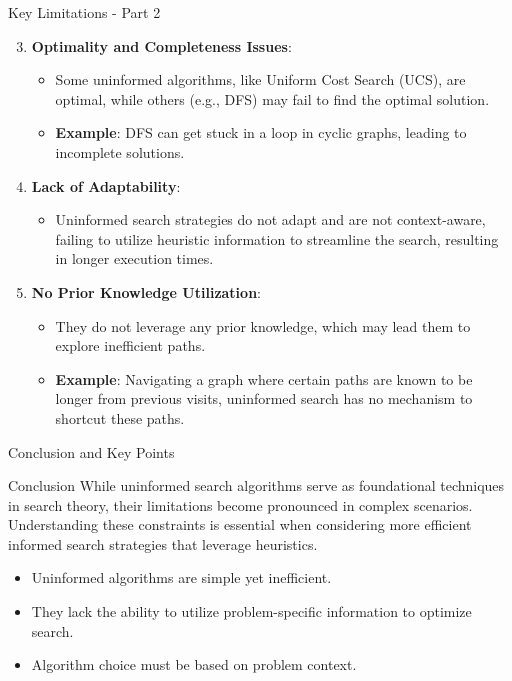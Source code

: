 \documentclass[aspectratio=169]{beamer}
\begin{document}
\begin{frame}[fragile]{Key Limitations - Part 2}
    \begin{enumerate}
        \setcounter{enumi}{2} %
        \item \textbf{Optimality and Completeness Issues}:
        \begin{itemize}
            \item Some uninformed algorithms, like Uniform Cost Search (UCS), are optimal, while others (e.g., DFS) may fail to find the optimal solution.
            \item \textbf{Example}: DFS can get stuck in a loop in cyclic graphs, leading to incomplete solutions.
        \end{itemize}
        
        \item \textbf{Lack of Adaptability}:
        \begin{itemize}
            \item Uninformed search strategies do not adapt and are not context-aware, failing to utilize heuristic information to streamline the search, resulting in longer execution times.
        \end{itemize}
        
        \item \textbf{No Prior Knowledge Utilization}:
        \begin{itemize}
            \item They do not leverage any prior knowledge, which may lead them to explore inefficient paths.
            \item \textbf{Example}: Navigating a graph where certain paths are known to be longer from previous visits, uninformed search has no mechanism to shortcut these paths.
        \end{itemize}
    \end{enumerate}
\end{frame}

\begin{frame}[fragile]{Conclusion and Key Points}
    \begin{block}{Conclusion}
        While uninformed search algorithms serve as foundational techniques in search theory, their limitations become pronounced in complex scenarios. Understanding these constraints is essential when considering more efficient informed search strategies that leverage heuristics.
    \end{block}
    
    \begin{itemize}
        \item Uninformed algorithms are simple yet inefficient.
        \item They lack the ability to utilize problem-specific information to optimize search.
        \item Algorithm choice must be based on problem context.
    \end{itemize}
\end{frame}
\end{document}
